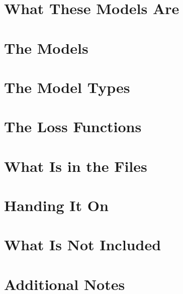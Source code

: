 \documentclass[11pt,a4paper]{article}
\begin{document}

\section{What These Models Are}


\section{The Models}


\section{The Model Types}


\section{The Loss Functions}\label{sec:losses}


\section{What Is in the Files}


\section{Handing It On}\label{sec:handover}


\section{What Is Not Included}


\section{Additional Notes}\label{sec:additional}


% 
% 
\end{document}

